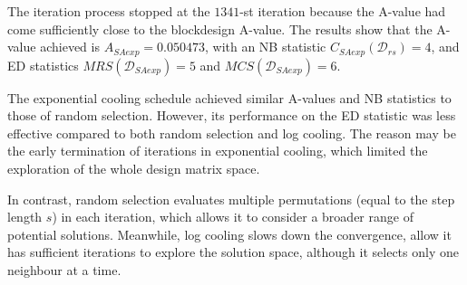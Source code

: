 \documentclass[
  a4paper,
  oneside,
  openany,
  12pt,
  onecolumn]{book}
\theoremstyle{plain}
\theoremstyle{definition}
\theoremstyle{remark}
\begin{document}
\begin{figure}


\caption{\label{fig-align}}

\end{figure}%

The iteration process stopped at the \(1341\)-st iteration because the
A-value had come sufficiently close to the blockdesign A-value. The
results show that the A-value achieved is \(A_{SAexp} = 0.050473\), with
an NB statistic \(C_{SAexp}(\mathcal{D}_{rs})=4\), and ED statistics
\(MRS(\mathcal{D}_{SAexp})=5\) and \(MCS(\mathcal{D}_{SAexp})=6\).

The exponential cooling schedule achieved similar A-values and NB
statistics to those of random selection. However, its performance on the
ED statistic was less effective compared to both random selection and
log cooling. The reason may be the early termination of iterations in
exponential cooling, which limited the exploration of the whole design
matrix space.

In contrast, random selection evaluates multiple permutations (equal to
the step length \(s\)) in each iteration, which allows it to consider a
broader range of potential solutions. Meanwhile, log cooling slows down
the convergence, allow it has sufficient iterations to explore the
solution space, although it selects only one neighbour at a time.
\end{document}

